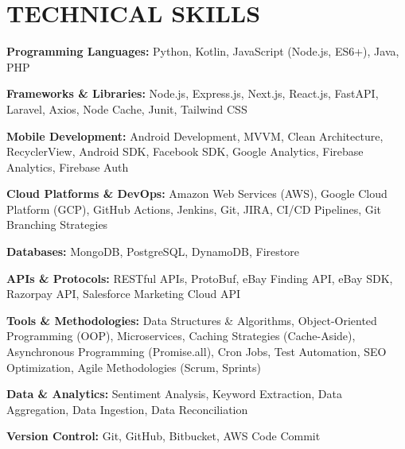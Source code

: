 \documentclass[letterpaper,11pt]{article}
\begin{document}
\section{\color{airforceblue}TECHNICAL SKILLS}
 \begin{itemize}[leftmargin=0in, label={}]
    \small{\item{
     \textbf{\normalsize{Programming Languages:}}{ \normalsize{Python, Kotlin, JavaScript (Node.js, ES6+), Java, PHP}} \\
      \vspace{1.2pt}
      
     \textbf{\normalsize{Frameworks \& Libraries:}}{ \normalsize{Node.js, Express.js, Next.js, React.js, FastAPI, Laravel, Axios, Node Cache, Junit, Tailwind CSS}} \\
      \vspace{1.2pt}
      
     \textbf{\normalsize{Mobile Development:}}{ \normalsize{Android Development, MVVM, Clean Architecture, RecyclerView, Android SDK, Facebook SDK, Google Analytics, Firebase Analytics, Firebase Auth}} \\
      \vspace{1.2pt}
      
     \textbf{\normalsize{Cloud Platforms \& DevOps:}}{ \normalsize{Amazon Web Services (AWS), Google Cloud Platform (GCP), GitHub Actions, Jenkins, Git, JIRA, CI/CD Pipelines, Git Branching Strategies}} \\
      \vspace{1.2pt}
      
     \textbf{\normalsize{Databases:}}{ \normalsize{MongoDB, PostgreSQL, DynamoDB, Firestore}} \\
      \vspace{1.2pt}
      
     \textbf{\normalsize{APIs \& Protocols:}}{ \normalsize{RESTful APIs, ProtoBuf, eBay Finding API, eBay SDK, Razorpay API, Salesforce Marketing Cloud API}} \\
      \vspace{1.2pt}
      
     \textbf{\normalsize{Tools \& Methodologies:}}{ \normalsize{Data Structures \& Algorithms, Object-Oriented Programming (OOP), Microservices, Caching Strategies (Cache-Aside), Asynchronous Programming (Promise.all), Cron Jobs, Test Automation, SEO Optimization, Agile Methodologies (Scrum, Sprints)}} \\
      \vspace{1.2pt}
      
     \textbf{\normalsize{Data \& Analytics:}}{ \normalsize{Sentiment Analysis, Keyword Extraction, Data Aggregation, Data Ingestion, Data Reconciliation}} \\
      \vspace{1.2pt}
      
     \textbf{\normalsize{Version Control:}}{ \normalsize{Git, GitHub, Bitbucket, AWS Code Commit}}

     }}
 \end{itemize}
 \vspace{-16pt}
 
\end{document}
